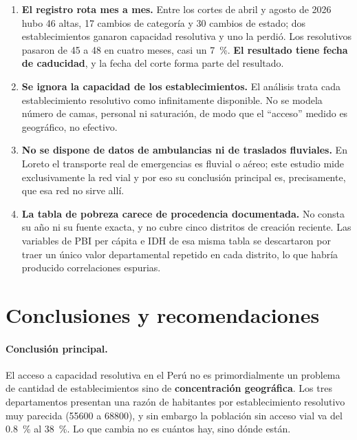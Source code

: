 \documentclass[11pt,a4paper]{article}
\begin{document}
\begin{enumerate}
\item \textbf{El registro rota mes a mes.} Entre los cortes de abril y agosto de 2026 hubo
\num{46} altas, \num{17} cambios de categoría y \num{30} cambios de estado; dos
establecimientos ganaron capacidad resolutiva y uno la perdió. Los resolutivos pasaron de
\num{45} a \num{48} en cuatro meses, casi un \SI{7}{\percent}. \textbf{El resultado tiene fecha
de caducidad}, y la fecha del corte forma parte del resultado.

\item \textbf{Se ignora la capacidad de los establecimientos.} El análisis trata cada
establecimiento resolutivo como infinitamente disponible. No se modela número de camas,
personal ni saturación, de modo que el ``acceso'' medido es geográfico, no efectivo.

\item \textbf{No se dispone de datos de ambulancias ni de traslados fluviales.} En Loreto el
transporte real de emergencias es fluvial o aéreo; este estudio mide exclusivamente la red
vial y por eso su conclusión principal es, precisamente, que esa red no sirve allí.

\item \textbf{La tabla de pobreza carece de procedencia documentada.} No consta su año ni su
fuente exacta, y no cubre cinco distritos de creación reciente. Las variables de PBI per cápita
e IDH de esa misma tabla se descartaron por traer un único valor departamental repetido en
cada distrito, lo que habría producido correlaciones espurias.
\end{enumerate}

\section{Conclusiones y recomendaciones}

\paragraph{Conclusión principal.} El acceso a capacidad resolutiva en el Perú no es
primordialmente un problema de cantidad de establecimientos sino de \textbf{concentración
geográfica}. Los tres departamentos presentan una razón de habitantes por establecimiento
resolutivo muy parecida (\num{55600} a \num{68800}), y sin embargo la población sin acceso
vial va del \SI{0.8}{\percent} al \SI{38}{\percent}. Lo que cambia no es cuántos hay, sino
dónde están.
\end{document}
